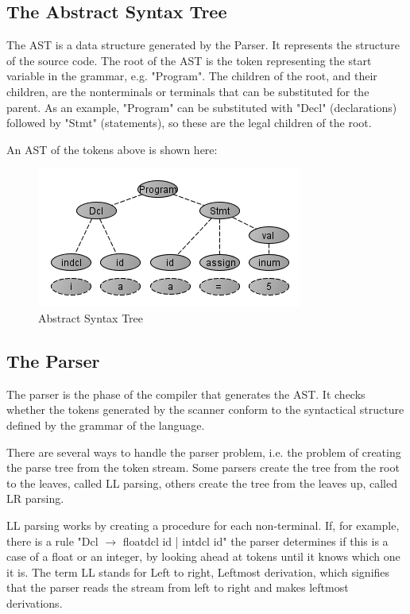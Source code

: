 \subsection{The Abstract Syntax Tree}
The AST is a data structure generated by the Parser. It represents the structure of the source code. The root of the AST is the token representing the start variable in the grammar, e.g. "Program". The children of the root, and their children, are the nonterminals or terminals that can be substituted for the parent. As an example, "Program" can be substituted with "Decl" (declarations) followed by "Stmt" (statements), so these are the legal children of the root.

An AST of the tokens above is shown here:

\begin{figure}[ht]
	\centering
		\includegraphics[scale = 0.7]{img/ast.png}
	\caption{Abstract Syntax Tree}
	\label{fig:ast}
\end{figure} 

\newpage
\subsection{The Parser}

The parser is the phase of the compiler that generates the AST. It checks whether the tokens generated by the scanner conform to the syntactical structure defined by the grammar of the language. 

There are several ways to handle the parser problem, i.e. the problem of creating the parse tree from the token stream. Some parsers create the tree from the root to the leaves, called LL parsing, others create the tree from the leaves up, called LR parsing. 

LL parsing works by creating a procedure for each non-terminal. If, for example, there is a rule "Dcl $\rightarrow$ floatdcl id | intdcl id" the parser determines if this is a case of a float or an integer, by looking ahead at tokens until it knows which one it is. The term LL stands for Left to right, Leftmost derivation, which signifies that the parser reads the stream from left to right and makes leftmost derivations.

